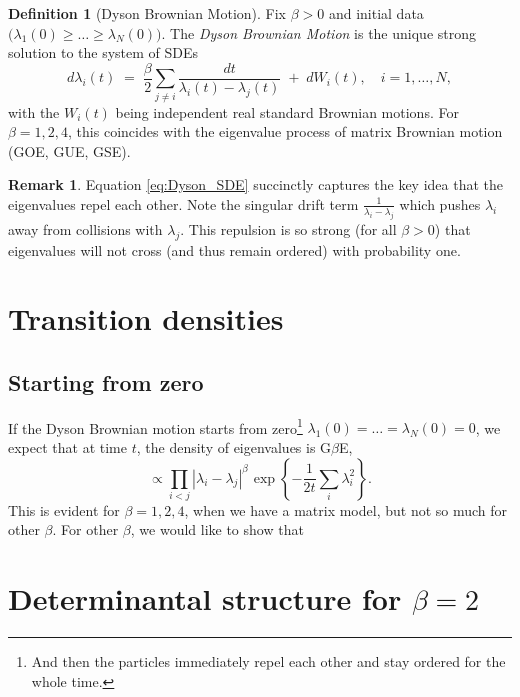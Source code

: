 \documentclass[letterpaper,11pt,oneside,reqno]{article}
\numberwithin{equation}{section}
\newcommand{\ssp}{\hspace{1pt}}
\theoremstyle{definition}
\newtheorem{definition}[proposition]{Definition}
\newtheorem{remark}[proposition]{Remark}
\begin{document}
\begin{definition}[Dyson Brownian Motion]
\label{def:DBM}
Fix $\beta>0$ and initial data $\bigl(\lambda_1(0)\ge \dots \ge \lambda_N(0)\bigr)$. The \emph{Dyson Brownian Motion} is the unique strong solution to the system of SDEs
\begin{equation}
\label{eq:Dyson_SDE}
d\lambda_i(t)
\;=\;
\frac{\beta}{2}\sum_{j\neq i}\frac{dt}{\lambda_i(t)-\lambda_j(t)}
\;+\;
dW_i(t),
\quad
i=1,\dots,N,
\end{equation}
with the $W_i(t)$ being independent real standard Brownian motions. For $\beta=1,2,4$, this coincides with the eigenvalue process of matrix Brownian motion (GOE, GUE, GSE).
\end{definition}

\begin{remark}
	Equation \eqref{eq:Dyson_SDE} succinctly captures the key idea that the eigenvalues repel each other. Note the singular drift term $\frac{1}{\lambda_i-\lambda_j}$ which pushes $\lambda_i$ away from collisions with $\lambda_j$. This repulsion is so strong (for all $\beta>0$)
	that eigenvalues will not cross (and thus remain ordered) with probability one.
\end{remark}



\section{Transition densities}

\subsection{Starting from zero}

If the Dyson Brownian motion starts from zero\footnote{And then the particles immediately
repel each other and stay ordered for the whole time.}
$\lambda_1(0)=\dots=\lambda_N(0)=0$,
we expect that at time $t$, the density of eigenvalues
is G$\beta$E,
\begin{equation*}
	\propto \prod_{i<j}|\lambda_i-\lambda_j|^{\beta}\ssp
	\exp\left\{ -\frac{1}{2t}\sum_{i}\lambda_i^2 \right\}.
\end{equation*}
This is evident for $\beta=1,2,4$, when we have a matrix model, but not so
much for other $\beta$. For other $\beta$, we would like to show that






\section{Determinantal structure for $\beta=2$}
\end{document}
